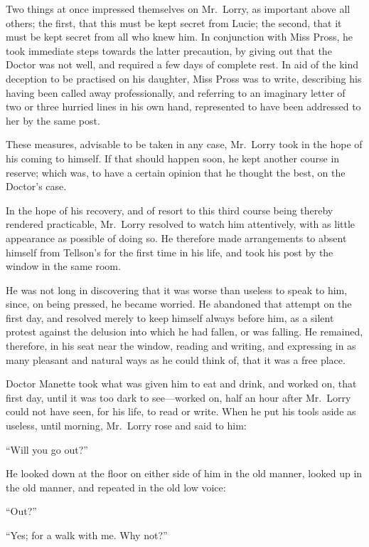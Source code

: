 Two things at once impressed themselves on Mr.\ Lorry, as important
above all others; the first, that this must be kept secret from Lucie;
the second, that it must be kept secret from all who knew him.  In
conjunction with Miss Pross, he took immediate steps towards the
latter precaution, by giving out that the Doctor was not well, and
required a few days of complete rest.  In aid of the kind deception
to be practised on his daughter, Miss Pross was to write, describing
his having been called away professionally, and referring to an
imaginary letter of two or three hurried lines in his own hand,
represented to have been addressed to her by the same post.

These measures, advisable to be taken in any case, Mr.\ Lorry took in
the hope of his coming to himself.  If that should happen soon, he kept
another course in reserve; which was, to have a certain opinion that he
thought the best, on the Doctor's case.

In the hope of his recovery, and of resort to this third course being
thereby rendered practicable, Mr.\ Lorry resolved to watch him
attentively, with as little appearance as possible of doing so.
He therefore made arrangements to absent himself from Tellson's for the
first time in his life, and took his post by the window in the same room.

He was not long in discovering that it was worse than useless to speak
to him, since, on being pressed, he became worried.  He abandoned that
attempt on the first day, and resolved merely to keep himself always
before him, as a silent protest against the delusion into which he had
fallen, or was falling.  He remained, therefore, in his seat near the
window, reading and writing, and expressing in as many pleasant and
natural ways as he could think of, that it was a free place.

Doctor Manette took what was given him to eat and drink, and worked on,
that first day, until it was too dark to see---worked on, half an hour
after Mr.\ Lorry could not have seen, for his life, to read or write.
When he put his tools aside as useless, until morning, Mr.\ Lorry rose
and said to him:

``Will you go out?''

He looked down at the floor on either side of him in the old manner,
looked up in the old manner, and repeated in the old low voice:

``Out?''

``Yes; for a walk with me.  Why not?''

